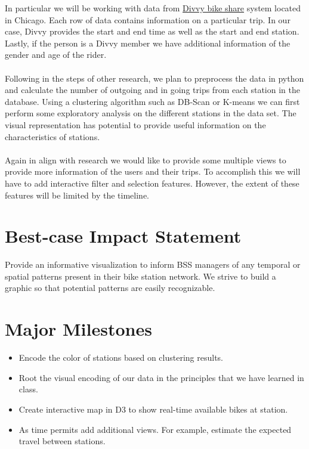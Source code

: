 \documentclass{proc}
\begin{document}
In particular we will be working with data from \href{https://www.divvybikes.com/system-data}{\color{blue} Divvy bike share} system located in Chicago. Each row of data contains information on a particular trip. In our case, Divvy provides the start and end time as well as the start and end station. Lastly, if the person is a Divvy member we have additional information of the gender and age of the rider.
\\~\\
\noindent Following in the steps of other research, we plan to preprocess the data in python and calculate the number of outgoing and in going trips from each station in the database. Using a clustering algorithm such as DB-Scan or K-means we can first perform some exploratory analysis on the different stations in the data set. The visual representation has potential to provide useful information on the characteristics of stations. 
\\~\\ 
\noindent Again in align with research we would like to provide some multiple views to provide more information of the users and their trips. To accomplish this we will have to add interactive filter and selection features. However, the extent of these features will be limited by the timeline.    

\section{Best-case Impact Statement}

Provide an informative visualization to inform BSS managers of any temporal or spatial patterns present in their bike station network. We strive to build a graphic so that potential patterns are easily recognizable.   

\section{Major Milestones}

\begin{itemize}

\item Encode the color of stations based on clustering results. 
\item Root the visual encoding of our data in the principles that we have learned in class. 
\item Create interactive map in D3 to show real-time available bikes at station.  
\item As time permits add additional views. For example, estimate the expected travel between stations. 
\end{itemize}
\end{document}
